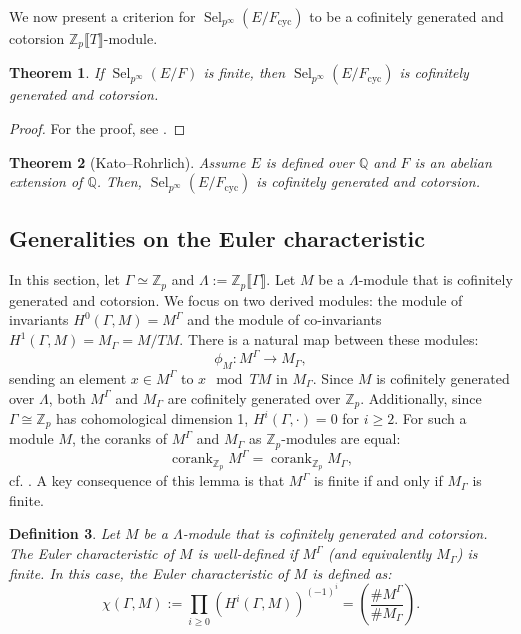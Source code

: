\documentclass[12pt]{amsart}
\newtheorem{theorem}{Theorem}[section]
\newtheorem{definition}[theorem]{Definition}
\newcommand{\Z}{\mathbb{Z}}
\newcommand{\op}[1]{\operatorname{#1}}
\numberwithin{equation}{section}
\begin{document}
We now present a criterion for $\op{Sel}_{p^\infty}(E/F_{\op{cyc}})$ to be a cofinitely generated and cotorsion $\Z_p\llbracket T\rrbracket$-module.

\begin{theorem}
    If $\op{Sel}_{p^\infty}(E/F)$ is finite, then $\op{Sel}_{p^\infty}(E/F_{\op{cyc}})$ is cofinitely generated and cotorsion.
\end{theorem}

\begin{proof}
    For the proof, see \cite[Theorem 1.4]{GreenbergIwasawa}.
\end{proof}

\begin{theorem}[Kato--Rohrlich]
    Assume $E$ is defined over $\mathbb{Q}$ and $F$ is an abelian extension of $\mathbb{Q}$. Then, $\op{Sel}_{p^\infty}(E/F_{\op{cyc}})$ is cofinitely generated and cotorsion.
\end{theorem}
\subsection{Generalities on the Euler characteristic}
In this section, let $\Gamma\simeq \Z_p$ and $\Lambda:=\Z_p\llbracket \Gamma \rrbracket$. Let $ M $ be a $\Lambda$-module that is cofinitely generated and cotorsion. We focus on two derived modules: the module of invariants $ H^0(\Gamma, M) = M^\Gamma $ and the module of co-invariants $ H^1(\Gamma, M) = M_\Gamma = M / TM $. There is a natural map between these modules:
\[
\phi_M: M^\Gamma \rightarrow M_\Gamma,
\]
sending an element $ x \in M^\Gamma $ to $ x \mod{TM} $ in $ M_\Gamma $. Since $ M $ is cofinitely generated over $\Lambda$, both $ M^\Gamma $ and $ M_\Gamma $ are cofinitely generated over $\Z_p$. Additionally, since $\Gamma \cong \Z_p$ has cohomological dimension 1, $ H^i(\Gamma, \cdot) = 0 $ for $ i \geq 2 $. For such a module $ M $, the coranks of $ M^\Gamma $ and $ M_\Gamma $ as $\Z_p$-modules are equal:
    \[
    \operatorname{corank}_{\Z_p} M^\Gamma = \operatorname{corank}_{\Z_p} M_\Gamma,
    \]
cf. \cite[Lemma 2.1]{stats1}. A key consequence of this lemma is that $ M^\Gamma $ is finite if and only if $ M_\Gamma $ is finite.

\begin{definition}
    Let $ M $ be a $\Lambda$-module that is cofinitely generated and cotorsion. The \emph{Euler characteristic} of $ M $ is well-defined if $ M^\Gamma $ (and equivalently $ M_\Gamma $) is finite. In this case, the \emph{Euler characteristic} of $ M $ is defined as:
    \[
    \chi(\Gamma, M) := \prod_{i \geq 0} \left(H^i(\Gamma, M)\right)^{(-1)^i} = \left(\frac{\# M^\Gamma}{\# M_\Gamma}\right).
    \]
\end{definition}
\end{document}
